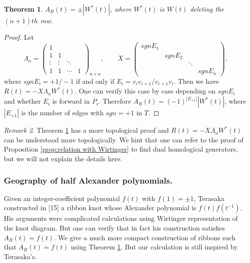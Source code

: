 \documentclass{amsart}
\newtheorem{thm}{Theorem}[subsection]
\theoremstyle{definition}
\theoremstyle{remark}
\newtheorem{rem}[thm]{Remark}
\numberwithin{equation}{subsection}
\begin{document}
\begin{thm}\label{thm:algo3}
$A_{R}(t)=\pm|W^{*}(t)|$, where $W^{*}(t)$ is $W(t)$ deleting the $(n+1)th$ row.
\end{thm}

\begin{proof}
Let
\[
\Lambda_{n} = \begin{pmatrix}
1 & & & \\
1 & 1 & & \\
\vdots & \vdots & \ddots & \\
1 & 1 & \cdots & 1
\end{pmatrix}_{n \times n}, \qquad X = \begin{pmatrix}
sgnE_{1} & & & \\
& sgnE_{2} & & \\
& & \ddots & \\
& & & sgnE_{n}
\end{pmatrix},
\]
where $sgnE_{i}=+1/-1$ if and only if $E_{i}=v_{i}v_{i+1}/v_{i+1}v_{i}$. 
Then we have $R(t)=-X\Lambda_{n}W^{*}(t)$. 
One can verify this case by case depending on $sgnE_{i}$ and whether $E_{i}$ is forward in $P_{i}$. Therefore $A_{R}(t)=(-1)^{|E_{+1}|}|W^{*}(t)|$, where $|E_{+1}|$ is the number of edges with $sgn=+1$ in $T$.
\end{proof}

\begin{rem}
Theorem \ref{thm:algo3} has a more topological proof and $R(t)=-X\Lambda_{n}W^{*}(t)$ can be understood more topologically. We hint that one can refer to the proof of Proposition \ref{prop:relation with  Wirtinger} to find dual homological generators, but we will not explain the details here.
\end{rem}

\subsubsection{Geography of half Alexander polynomials.}

Given an integer-coefficient polynomial $f(t)$ with $f(1)=\pm 1$, Terasaka constructed in [15] a ribbon knot whose Alexander polynomial is $f(t)f(t^{-1})$. His arguments were complicated calculations using Wirtinger representation of the knot diagram. But one can verify that in fact his construction satisfies $A_{R}(t)\dot{=}f(t)$. We give a much more compact construction of ribbons such that $A_{R}(t)\dot{=}f(t)$ using Theorem \ref{thm:algo3}. But our calculation is still inspired by Terasaka's.
\end{document}
